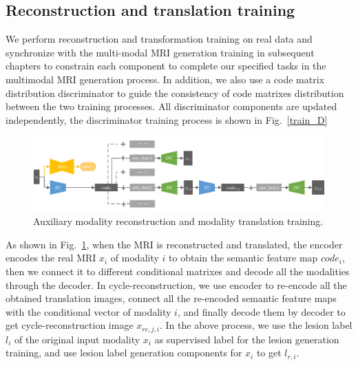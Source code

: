 \documentclass[letterpaper]{article} %
\begin{document}
\subsection{Reconstruction and translation training}
We perform reconstruction and transformation training on real data and synchronize with the multi-modal MRI generation training in subsequent chapters to constrain each component to complete our specified tasks in the multimodal MRI generation process. In addition, we also use a code matrix distribution discriminator to guide the consistency of code matrixes distribution between the two training processes. All discriminator components are updated independently, the discriminator training process is shown in Fig.~\ref{train_D}

\begin{figure}
	\centering
	\includegraphics[width=0.98\columnwidth]{figures/trans_train}
	\caption{Auxiliary modality reconstruction and modality translation training.}
	\label{trans_train}
\end{figure}

As shown in Fig.~\ref{trans_train}, when the MRI is reconstructed and translated, the encoder encodes the real MRI $x_i$ of modality $i$ to obtain the semantic feature map $code_{i}$, then we connect it to different conditional matrixes and decode all the modalities through the decoder. In cycle-reconstruction, we use encoder to re-encode all the obtained translation images, connect all the re-encoded semantic feature maps with the conditional vector of modality $i$, and finally decode them by decoder to get cycle-reconstruction image $x_{rc,j,i}$. In the above process, we use the lesion label $l_i$ of the original input modality $x_i$ as supervised label for the lesion generation training, and use lesion label generation components for $x_i$ to get $l_{r,i}$.
\end{document}
